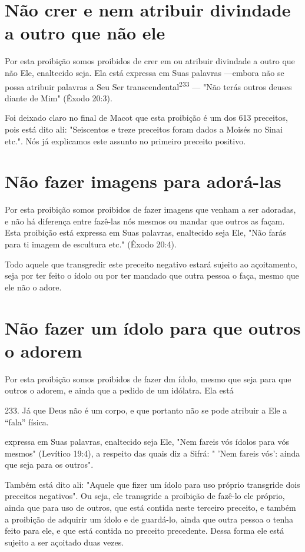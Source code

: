 \section{Não crer e nem atribuir divindade a outro que não ele}

Por esta proibição somos proibidos de crer em ou atribuir divinda­de a
outro que não Ele, enaltecido seja. Ela está expressa em Suas palavras
---embora não se possa atribuir palavras a Seu Ser
transcendental\textsuperscript{233} --- "Não te­rás outros deuses diante
de Mim" (Êxodo 20:3).

Foi deixado claro no final de Macot que esta proibição é um dos 613
preceitos, pois está dito ali: "Seiscentos e treze preceitos foram dados
a Moisés no Sinai etc.". Nós já explicamos este assunto no primeiro
preceito positivo.

\section{Não fazer imagens para adorá-las}

Por esta proibição somos proibidos de fazer imagens que venham a ser
adoradas, e não há diferença entre fazê-las nós mesmos ou mandar que
outros as façam. Esta proibição está expressa em Suas palavras,
enaltecido seja Ele, "Não farás para ti imagem de escultura etc." (Êxodo
20:4).

Todo aquele que transgredir este preceito negativo estará sujeito ao
açoitamento, seja por ter feito o ídolo ou por ter mandado que outra
pessoa o faça, mesmo que ele não o adore.

\section{Não fazer um ídolo para que outros o adorem}

Por esta proibição somos proibidos de fazer dm ídolo, mesmo que seja
para que outros o adorem, e ainda que a pedido de um idólatra. Ela está

233. Já que Deus não é um corpo, e que portanto não se pode atribuir a
Ele a ``fala'' física.

expressa em Suas palavras, enaltecido seja Ele, "Nem fareis vós ídolos
para vós mesmos" (Levítico 19:4), a respeito das quais diz a Sifrá: "
'Nem fareis vós': ainda que seja para os outros".

Também está dito ali: "Aquele que fizer um ídolo para uso próprio
transgride dois preceitos negativos". Ou seja, ele transgride a
proibição de fazê-lo ele próprio, ainda que para uso de outros, que está
contida neste terceiro pre­ceito, e também a proibição de adquirir um
ídolo e de guardá-lo, ainda que ou­tra pessoa o tenha feito para ele, e
que está contida no preceito precedente. Dessa forma ele está sujeito a
ser açoitado duas vezes.

